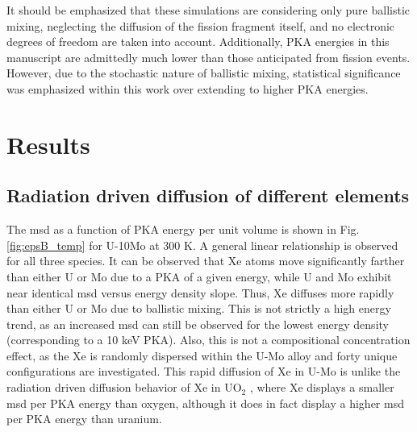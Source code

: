 \documentclass[review]{elsarticle}
\begin{document}
It should be emphasized that these simulations are considering only pure ballistic mixing, neglecting the diffusion of the fission fragment itself, and no electronic degrees of freedom are taken into account. Additionally, PKA energies in this manuscript are admittedly much lower than those anticipated from fission events. However, due to the stochastic nature of ballistic mixing, statistical significance was emphasized within this work over extending to higher PKA energies. 

\FloatBarrier

\section{Results}

\subsection{Radiation driven diffusion of different elements}

The msd as a function of PKA energy per unit volume is shown in Fig. \ref{fig:epsB_temp} for U-10Mo at 300 K. A general linear relationship is observed for all three species. It can be observed that Xe atoms move significantly farther than either U or Mo due to a PKA of a given energy, while U and Mo exhibit near identical msd versus energy density slope. Thus, Xe diffuses more rapidly than either U or Mo due to ballistic mixing. This is not strictly a high energy trend, as an increased msd can still be observed for the lowest energy density (corresponding to a 10 keV PKA). Also, this is not a compositional concentration effect, as the Xe is randomly dispersed within the U-Mo alloy and forty unique configurations are investigated. This rapid diffusion of Xe in U-Mo is unlike the radiation driven diffusion behavior of Xe in UO$_2$ \cite{cooper2016}, where Xe displays a smaller msd per PKA energy than oxygen, although it does in fact display a higher msd per PKA energy than uranium. 
\end{document}
